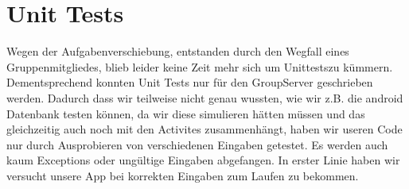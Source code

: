 \section{Unit Tests}
Wegen der Aufgabenverschiebung, entstanden durch den Wegfall eines Gruppenmitgliedes, blieb leider keine Zeit mehr sich um Unittestszu kümmern. Dementsprechend konnten Unit Tests nur für den GroupServer geschrieben werden.
Dadurch dass wir teilweise nicht genau wussten, wie wir z.B. die android Datenbank testen können, da wir diese simulieren hätten müssen und das gleichzeitig auch noch mit den Activites zusammenhängt, haben wir useren Code nur durch Ausprobieren von verschiedenen Eingaben getestet. Es werden auch kaum Exceptions oder ungültige Eingaben abgefangen. In erster Linie haben wir versucht unsere App bei korrekten Eingaben zum Laufen zu bekommen.